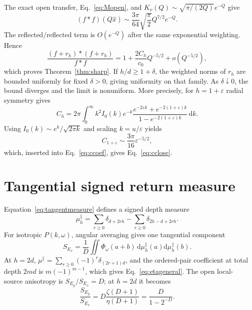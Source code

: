 \documentclass[aps,pra,twocolumn,superscriptaddress,longbibliography,nofootinbib,floatfix]{revtex4-2}
\theoremstyle{remark}
\newcommand{\dd}{\mathrm d}
\begin{document}
The exact open transfer, Eq.~\eqref{eq:Mopen}, and $K_\nu(Q)\sim\sqrt{\pi/(2Q)}e^{-Q}$ give
\begin{equation}
(f*f)(Q\hat x)\sim \frac{3\pi}{64}\sqrt{\frac{\pi}{2}}Q^{7/2}e^{-Q}.
\end{equation}
The reflected/reflected term is $O(e^{-Q})$ after the same exponential weighting.  Hence
\begin{equation}
\frac{(f+r_h)*(f+r_h)}{f*f}
=1+\frac{2C_h}{c_0}Q^{-5/2}+o(Q^{-5/2}),
\end{equation}
which proves Theorem~\ref{thm:sharp}.  If $h/d\ge1+\delta$, the weighted norms of $r_h$ are bounded uniformly for fixed $\delta>0$, giving uniformity on that family.  As $\delta\downarrow0$, the bound diverges and the limit is nonuniform.  More precisely, for $h=1+\varepsilon$ radial symmetry gives
\begin{equation}
C_h=2\pi\int_0^\infty k^2 I_0(k)
 e^{-k}\frac{e^{-2\varepsilon k}+e^{-2(1+\varepsilon)k}}{1-e^{-2(1+\varepsilon)k}}\,\dd k.
\end{equation}
Using $I_0(k)\sim e^k/\sqrt{2\pi k}$ and scaling $k=u/\varepsilon$ yields
\begin{equation}
C_{1+\varepsilon}\sim\frac{3\pi}{16}\varepsilon^{-5/2},
\end{equation}
which, inserted into Eq.~\eqref{eq:ccoef}, gives Eq.~\eqref{eq:cclose}.

\section{Tangential signed return measure}

Equation~\eqref{eq:tangentmeasure} defines a signed depth measure
\begin{equation}
\mu_h^\parallel=\sum_{r\ge0}\delta_{d+2rh}-
\sum_{r\ge0}\delta_{2h-d+2rh}.
\end{equation}
For isotropic $P(k,\omega)$, angular averaging gives one tangential component
\begin{equation}
S_{E_x}=\frac{1}{D}\iint\Phi_\omega(a+b)\,
\dd\mu_h^\parallel(a)\dd\mu_h^\parallel(b).
\end{equation}
At $h=2d$, $\mu^\parallel=\sum_{r\ge0}(-1)^r\delta_{(2r+1)d}$, and the ordered-pair coefficient at total depth $2md$ is $m(-1)^{m-1}$, which gives Eq.~\eqref{eq:etageneral}.  The open local-source anisotropy is $S_{E_y}/S_{E_x}=D$; at $h=2d$ it becomes
\begin{equation}
\frac{S_{E_y}}{S_{E_x}}=
D\frac{\zeta(D+1)}{\eta(D+1)}=
\frac{D}{1-2^{-D}}.
\end{equation}
\end{document}
